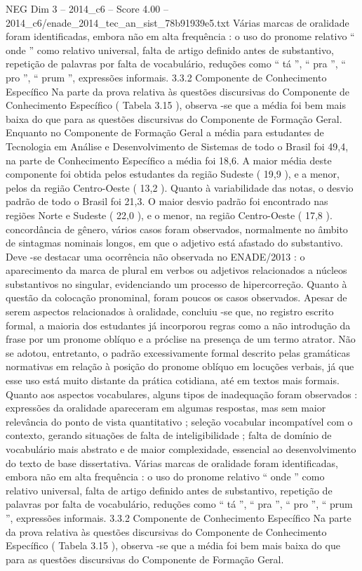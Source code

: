 \begin{textsample}{NEG Dim 3 – 2014\_c6 – Score 4.00 – 2014\_c6/enade\_2014\_tec\_an\_sist\_78b91939e5.txt}
Várias marcas de oralidade foram identificadas, embora não em alta frequência : o uso do pronome relativo “ onde ” como relativo universal, falta de artigo definido antes de substantivo, repetição de palavras por falta de vocabulário, reduções como “ tá ”, “ pra ”, “ pro ”, “ prum ”, expressões informais. 3.3.2 Componente de Conhecimento Específico Na parte da prova relativa às questões discursivas do Componente de Conhecimento Específico ( Tabela 3.15 ), observa -se que a média foi bem mais baixa do que para as questões discursivas do Componente de Formação Geral.
Enquanto no Componente de Formação Geral a média para estudantes de Tecnologia em Análise e Desenvolvimento de Sistemas de todo o Brasil foi 49,4, na parte de Conhecimento Específico a média foi 18,6.
A maior média deste componente foi obtida pelos estudantes da região Sudeste ( 19,9 ), e a menor, pelos da região Centro-Oeste ( 13,2 ).
Quanto à variabilidade das notas, o desvio padrão de todo o Brasil foi 21,3.
O maior desvio padrão foi encontrado nas regiões Norte e Sudeste ( 22,0 ), e o menor, na região Centro-Oeste ( 17,8 ). concordância de gênero, vários casos foram observados, normalmente no âmbito de sintagmas nominais longos, em que o adjetivo está afastado do substantivo.
Deve -se destacar uma ocorrência não observada no ENADE/2013 : o aparecimento da marca de plural em verbos ou adjetivos relacionados a núcleos substantivos no singular, evidenciando um processo de hipercorreção.
Quanto à questão da colocação pronominal, foram poucos os casos observados.
Apesar de serem aspectos relacionados à oralidade, concluiu -se que, no registro escrito formal, a maioria dos estudantes já incorporou regras como a não introdução da frase por um pronome oblíquo e a próclise na presença de um termo atrator.
Não se adotou, entretanto, o padrão excessivamente formal descrito pelas gramáticas normativas em relação à posição do pronome oblíquo em locuções verbais, já que esse uso está muito distante da prática cotidiana, até em textos mais formais.
Quanto aos aspectos vocabulares, alguns tipos de inadequação foram observados : expressões da oralidade apareceram em algumas respostas, mas sem maior relevância do ponto de vista quantitativo ; seleção vocabular incompatível com o contexto, gerando situações de falta de inteligibilidade ; falta de domínio de vocabulário mais abstrato e de maior complexidade, essencial ao desenvolvimento do texto de base dissertativa.
Várias marcas de oralidade foram identificadas, embora não em alta frequência : o uso do pronome relativo “ onde ” como relativo universal, falta de artigo definido antes de substantivo, repetição de palavras por falta de vocabulário, reduções como “ tá ”, “ pra ”, “ pro ”, “ prum ”, expressões informais. 3.3.2 Componente de Conhecimento Específico Na parte da prova relativa às questões discursivas do Componente de Conhecimento Específico ( Tabela 3.15 ), observa -se que a média foi bem mais baixa do que para as questões discursivas do Componente de Formação Geral.

\end{textsample}
